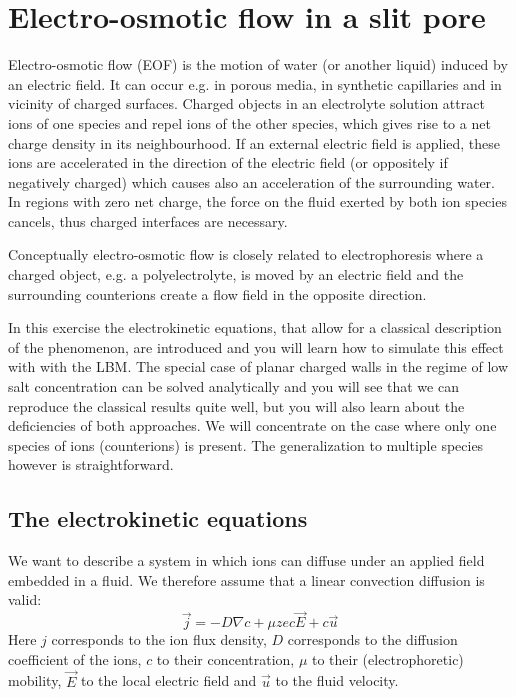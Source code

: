 \chapter{Electro-osmotic flow in a slit pore}
Electro-osmotic flow (EOF) is the motion of water (or another liquid)
induced by an electric field. It can occur e.g. in porous media,
in synthetic capillaries and in vicinity of charged surfaces.
Charged objects in an electrolyte solution attract ions of one
species and repel ions of the other species, which gives rise
to a net charge density in its neighbourhood. If an external
electric field is applied, these ions are accelerated in the direction
of the electric field (or oppositely if negatively charged) which
causes also an acceleration of the surrounding water. In regions
with zero net charge, the force on the fluid exerted by both ion
species cancels, thus charged interfaces are necessary.

Conceptually electro-osmotic flow is closely related to electrophoresis
where a charged object, e.g. a polyelectrolyte, is moved by an
electric field and the surrounding counterions create a flow field
in the opposite direction. 

In this exercise the electrokinetic equations, that allow for a classical
description of the phenomenon, are introduced and you will learn
how to simulate this effect with \ES{} with the LBM. The special case of
planar charged walls in the regime of low salt concentration can
be solved analytically and you will see that we can reproduce the
classical results quite well, but you will also learn about the
deficiencies of both approaches. We will concentrate on the case
where only one species of ions (counterions) is present. The generalization
to multiple species however is straightforward.

\section{The electrokinetic equations}
We want to describe a system in which ions can diffuse under an
applied field embedded in a fluid. We therefore assume that a 
linear convection diffusion is valid:
\begin{equation}
  \vec{j}=-D \nabla c + \mu ze c \vec{E} + c \vec{u}
\end{equation}
Here $j$ corresponds to the ion flux density, $D$ corresponds 
to the diffusion coefficient of the ions,
$c$ to their concentration, $\mu$ to their (electrophoretic)
mobility, $\vec{E}$ to the local electric field and $\vec{u}$
to the fluid velocity.

